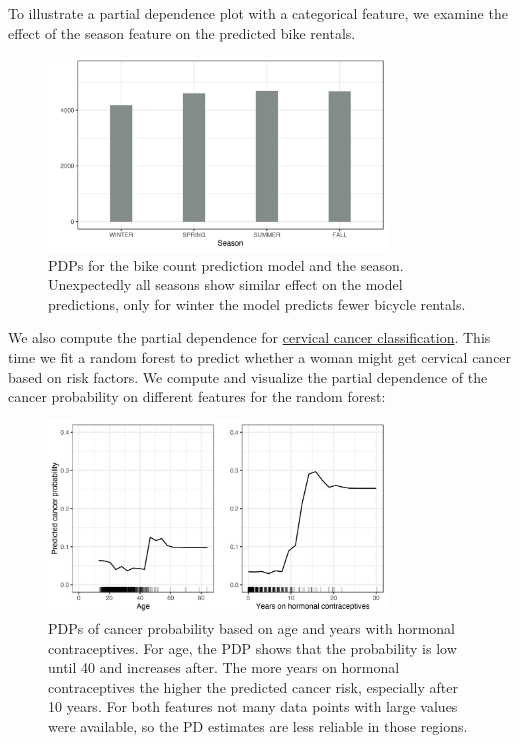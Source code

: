 \documentclass[
  11pt,
]{scrbook}
\begin{document}
To illustrate a partial dependence plot with a categorical feature, we examine the effect of the season feature on the predicted bike rentals.

\begin{figure}

{\centering \includegraphics[width=0.8\textwidth]{images/pdp-bike-cat-1} 

}

\caption{PDPs for the bike count prediction model and the season. Unexpectedly all seasons show similar effect on the model predictions, only for winter the model predicts fewer bicycle rentals.}\label{fig:pdp-bike-cat}
\end{figure}

We also compute the partial dependence for \protect\hyperlink{cervical}{cervical cancer classification}.
This time we fit a random forest to predict whether a woman might get cervical cancer based on risk factors.
We compute and visualize the partial dependence of the cancer probability on different features for the random forest:

\begin{figure}

{\centering \includegraphics[width=0.8\textwidth]{images/pdp-cervical-1} 

}

\caption{PDPs of cancer probability based on age and years with hormonal contraceptives. For age, the PDP shows that the probability is low until 40 and increases after. The more years on hormonal contraceptives the higher the predicted cancer risk, especially after 10 years. For both features not many data points with large values were available, so the PD estimates are less reliable in those regions.}\label{fig:pdp-cervical}
\end{figure}
\end{document}
